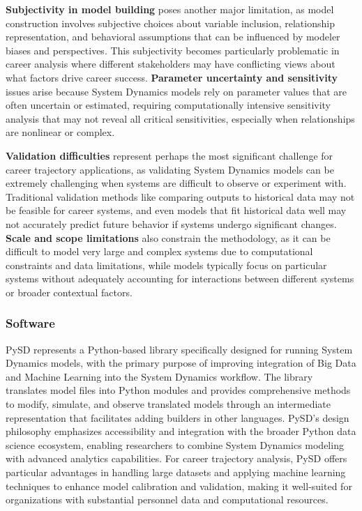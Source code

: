 \documentclass[main.tex]{subfiles}
\begin{document}
\textbf{Subjectivity in model building} poses another major limitation, as model construction involves subjective choices about variable inclusion, relationship representation, and behavioral assumptions that can be influenced by modeler biases and perspectives\parencite{sd_limitations}. This subjectivity becomes particularly problematic in career analysis where different stakeholders may have conflicting views about what factors drive career success. \textbf{Parameter uncertainty and sensitivity} issues arise because System Dynamics models rely on parameter values that are often uncertain or estimated, requiring computationally intensive sensitivity analysis that may not reveal all critical sensitivities, especially when relationships are nonlinear or complex\parencite{sd_limitations}.

\textbf{Validation difficulties} represent perhaps the most significant challenge for career trajectory applications, as validating System Dynamics models can be extremely challenging when systems are difficult to observe or experiment with\parencite{sd_limitations}. Traditional validation methods like comparing outputs to historical data may not be feasible for career systems, and even models that fit historical data well may not accurately predict future behavior if systems undergo significant changes. \textbf{Scale and scope limitations} also constrain the methodology, as it can be difficult to model very large and complex systems due to computational constraints and data limitations, while models typically focus on particular systems without adequately accounting for interactions between different systems or broader contextual factors\parencite{sd_limitations}.

\subsubsection{Software}


PySD represents a Python-based library specifically designed for running System Dynamics models, with the primary purpose of improving integration of Big Data and Machine Learning into the System Dynamics workflow\parencite{pysd}. The library translates model files into Python modules and provides comprehensive methods to modify, simulate, and observe translated models through an intermediate representation that facilitates adding builders in other languages. PySD's design philosophy emphasizes accessibility and integration with the broader Python data science ecosystem, enabling researchers to combine System Dynamics modeling with advanced analytics capabilities. For career trajectory analysis, PySD offers particular advantages in handling large datasets and applying machine learning techniques to enhance model calibration and validation, making it well-suited for organizations with substantial personnel data and computational resources.
\end{document}
